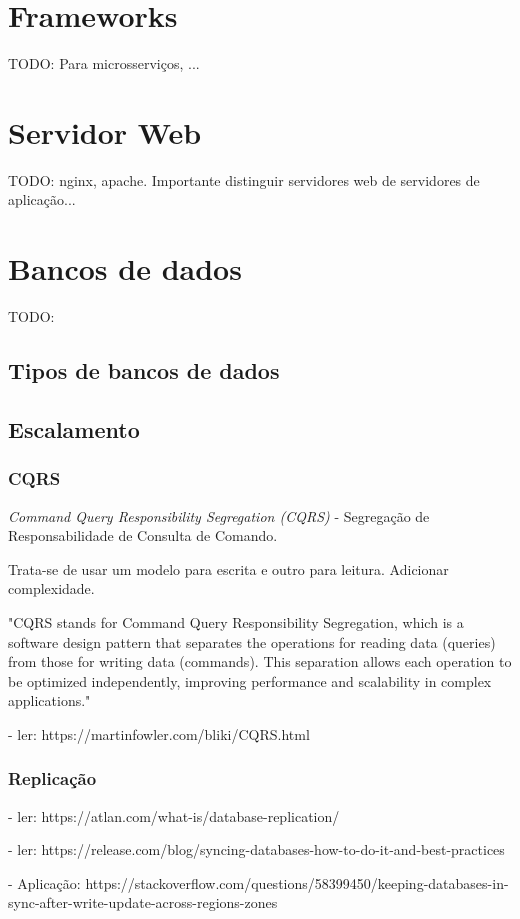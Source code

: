 \section{Frameworks}
TODO: Para microsserviços, ...

\section{Servidor Web}
TODO: nginx, apache. 
Importante distinguir servidores web de servidores de aplicação...

\section{Bancos de dados}
TODO:

\subsection{Tipos de bancos de dados}


\subsection{Escalamento}

\subsubsection{CQRS}
\emph{Command Query Responsibility Segregation (CQRS)} - Segregação de Responsabilidade de Consulta de Comando. 

Trata-se de usar um modelo para escrita e outro para leitura. Adicionar complexidade. 

"CQRS stands for Command Query Responsibility Segregation, which is a software design pattern that separates the operations for reading data (queries) from those for writing data (commands). This separation allows each operation to be optimized independently, improving performance and scalability in complex applications."


- ler: https://martinfowler.com/bliki/CQRS.html


\subsubsection{Replicação}
- ler: https://atlan.com/what-is/database-replication/

- ler: https://release.com/blog/syncing-databases-how-to-do-it-and-best-practices

- Aplicação: https://stackoverflow.com/questions/58399450/keeping-databases-in-sync-after-write-update-across-regions-zones

